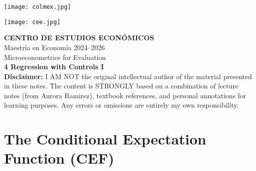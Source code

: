 \documentclass[12pt]{article}
\title{}
\author{}
\date{}
\begin{document}
\begin{titlepage}
    \vspace*{-1cm}
    \noindent
    \begin{minipage}[t]{0.49\textwidth}
        \texttt{[image: colmex.jpg]}
    \end{minipage}%
    \begin{minipage}[t]{0.49\textwidth}
        \raggedleft
        \texttt{[image: cee.jpg]}
    \end{minipage}

    \vspace*{2cm}

    \begin{center}
        \Huge \textbf{CENTRO DE ESTUDIOS ECONÓMICOS} \\[1.5em]
        \Large Maestría en Economía 2024--2026 \\[2em]
        \Large Microeconometrics for Evaluation \\[3em]
        \LARGE \textbf{4 Regression with Controls I} \\[3em]
        \large \textbf{Disclaimer:} I AM NOT the original intellectual author of the material presented in these notes. The content is STRONGLY based on a combination of lecture notes (from Aurora Ramirez), textbook references, and personal annotations for learning purposes. Any errors or omissions are entirely my own responsibility.\\[0.9em]
        
    \end{center}

    \vfill
\end{titlepage}

\newpage

\setcounter{secnumdepth}{2}
\setcounter{tocdepth}{4}
\tableofcontents

\newpage

\section*{\noindent\textbf{The Conditional Expectation Function (CEF)}}
\end{document}
